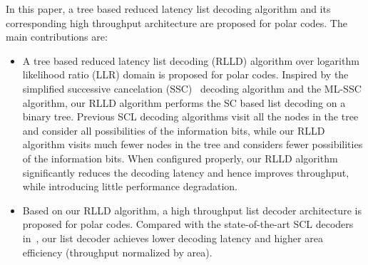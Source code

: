 \documentclass[journal]{IEEEtran}
\begin{document}
In this paper, a tree based reduced latency list decoding algorithm and its corresponding high throughput architecture are proposed for polar codes. The main contributions are:
\begin{itemize}
\item A tree based reduced latency list decoding (RLLD) algorithm over logarithm likelihood ratio (LLR) domain is proposed for polar codes. Inspired by the simplified successive cancelation (SSC)~\cite{low_latency_polar} decoding algorithm and the ML-SSC algorithm\cite{ml_ssc}, our RLLD algorithm performs the SC based list decoding on a binary tree. Previous SCL decoding algorithms visit all the nodes in the tree and consider all possibilities of the information bits, while our RLLD algorithm visits much fewer nodes in the tree and considers fewer possibilities of the information bits. When configured properly, our RLLD algorithm significantly reduces the decoding latency and hence improves throughput, while introducing little performance degradation.
\item Based on our RLLD algorithm, a high throughput list decoder architecture is proposed for polar codes. Compared with the state-of-the-art SCL decoders in~\cite{llr_list_tsp,jun_low_mem_list,yuan_low_latency}, our list decoder achieves lower decoding latency and higher area efficiency (throughput normalized by area).

\end{itemize}
\end{document}
